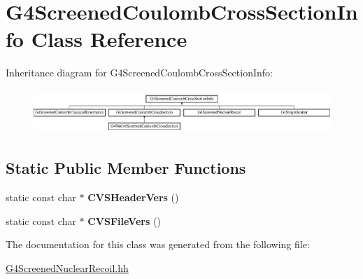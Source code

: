 \hypertarget{classG4ScreenedCoulombCrossSectionInfo}{\section{G4\-Screened\-Coulomb\-Cross\-Section\-Info Class Reference}
\label{classG4ScreenedCoulombCrossSectionInfo}
}
Inheritance diagram for G4\-Screened\-Coulomb\-Cross\-Section\-Info\-:\begin{figure}[H]
\begin{center}
\leavevmode
\includegraphics[height=1.673307cm]{classG4ScreenedCoulombCrossSectionInfo}
\end{center}
\end{figure}
\subsection*{Static Public Member Functions}
\begin{DoxyCompactItemize}
\item 
\hypertarget{classG4ScreenedCoulombCrossSectionInfo_ae27f3e0f725a0541e271618772c287a8}{static const char $\ast$ {\bfseries C\-V\-S\-Header\-Vers} ()}\label{classG4ScreenedCoulombCrossSectionInfo_ae27f3e0f725a0541e271618772c287a8}

\item 
\hypertarget{classG4ScreenedCoulombCrossSectionInfo_aa97230886b5279b5fe0413e19ab944a9}{static const char $\ast$ {\bfseries C\-V\-S\-File\-Vers} ()}\label{classG4ScreenedCoulombCrossSectionInfo_aa97230886b5279b5fe0413e19ab944a9}

\end{DoxyCompactItemize}


The documentation for this class was generated from the following file\-:\begin{DoxyCompactItemize}
\item 
\hyperlink{G4ScreenedNuclearRecoil_8hh}{G4\-Screened\-Nuclear\-Recoil.\-hh}\end{DoxyCompactItemize}
